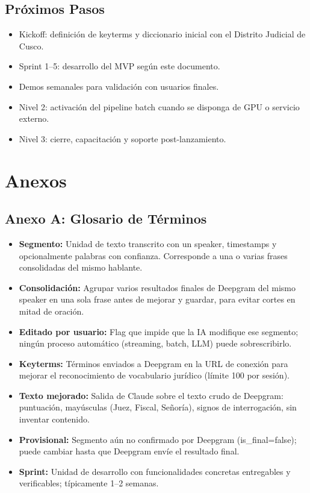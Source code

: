 \documentclass[12pt,a4paper]{report}
\begin{document}
\section{Próximos Pasos}

\begin{itemize}
    \item Kickoff: definición de keyterms y diccionario inicial con el Distrito Judicial de Cusco.
    \item Sprint 1--5: desarrollo del MVP según este documento.
    \item Demos semanales para validación con usuarios finales.
    \item Nivel 2: activación del pipeline batch cuando se disponga de GPU o servicio externo.
    \item Nivel 3: cierre, capacitación y soporte post-lanzamiento.
\end{itemize}

\chapter{Anexos}

\section{Anexo A: Glosario de Términos}

\begin{itemize}
    \item \textbf{Segmento:} Unidad de texto transcrito con un speaker, timestamps y opcionalmente palabras con confianza. Corresponde a una o varias frases consolidadas del mismo hablante.
    \item \textbf{Consolidación:} Agrupar varios resultados finales de Deepgram del mismo speaker en una sola frase antes de mejorar y guardar, para evitar cortes en mitad de oración.
    \item \textbf{Editado por usuario:} Flag que impide que la IA modifique ese segmento; ningún proceso automático (streaming, batch, LLM) puede sobrescribirlo.
    \item \textbf{Keyterms:} Términos enviados a Deepgram en la URL de conexión para mejorar el reconocimiento de vocabulario jurídico (límite 100 por sesión).
    \item \textbf{Texto mejorado:} Salida de Claude sobre el texto crudo de Deepgram: puntuación, mayúsculas (Juez, Fiscal, Señoría), signos de interrogación, sin inventar contenido.
    \item \textbf{Provisional:} Segmento aún no confirmado por Deepgram (is\_final=false); puede cambiar hasta que Deepgram envíe el resultado final.
    \item \textbf{Sprint:} Unidad de desarrollo con funcionalidades concretas entregables y verificables; típicamente 1--2 semanas.
\end{itemize}
\end{document}
